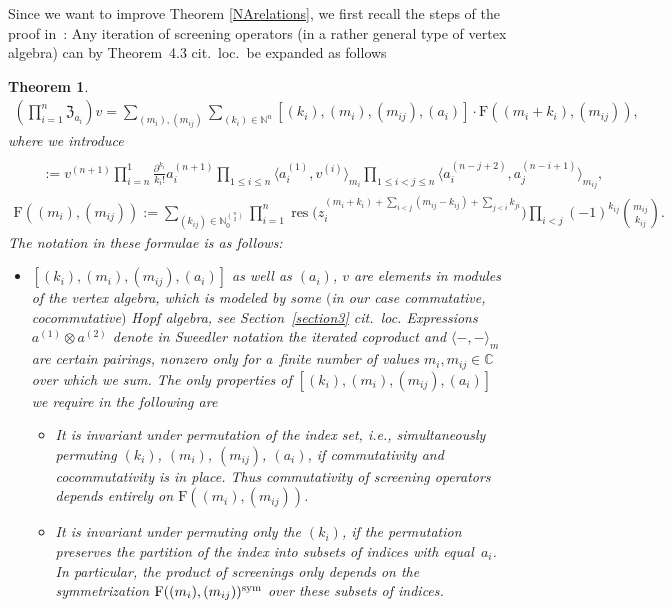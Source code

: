 \documentclass[pdftex]{sigma}%
\numberwithin{equation}{section}
\newtheorem{teo}{Theorem}[section]
\newcommand{\N}{\mathbb{N}}
\newcommand{\C}{\mathbb{C}}
\newcommand{\zem}{\mathfrak{Z}}
\newcommand{\Fp}{\mathrm{F}}
\begin{document}
Since we want to improve Theorem \ref{NArelations}, we first recall the steps of the proof in~\cite{Len17}: Any iteration of screening operators (in a rather general type of vertex algebra) can by Theorem~4.3 cit.~loc.~be expanded as follows
\begin{teo}\label{associativity}
\begin{gather*}
\left(\prod_{i=1}^n \zem_{a_i}\right)  v
=\sum_{(m_i),(m_{ij})} \sum_{(k_i)\in \N^n} [(k_i),(m_i),(m_{ij}),(a_i)]\cdot \Fp((m_i+k_i),(m_{ij})),
\end{gather*}
where we introduce
\begin{gather*}
[(k_i),(m_i),(m_{ij}),(a_i)]\\
\qquad{} :=v^{(n+1)}\prod_{i=n}^1 \frac{\partial^{k_i}}{k_i!}a_i^{(n+1)}
  \prod_{1\leq i \leq n}\big\langle a_i^{(1)},v^{(i)}\big\rangle_{m_i}
\prod_{1\leq i<j \leq n} \big\langle a_i^{(n-j+2)},a_j^{(n-i+1)}\big\rangle_{m_{ij}},\\
\Fp((m_i),(m_{ij}))
:=\sum_{(k_{ij})\in \N_0^{n\choose 2}}\prod_{i=1}^n \operatorname{res}\big(z_i^{(m_i+k_i)+\sum_{i<j}(m_{ij}-k_{ij})+\sum_{j<i}k_{ji}}\big)\prod_{i<j} (- 1)^{k_{ij}}{m_{ij} \choose k_{ij}}.
\end{gather*}
The notation in these formulae is as follows:
\begin{itemize}\itemsep=0pt
	\item $[(k_i),(m_i),(m_{ij}),(a_i)]$ as well as $(a_i)$, $v$ are elements in modules of the vertex algebra, which is modeled by some $($in our case commutative, cocommutative$)$ Hopf algebra, see Section~\ref{section3} cit.~loc. Expressions $a^{(1)}\otimes a^{(2)}$ denote in Sweedler notation the iterated coproduct and $\langle-,-\rangle_m$ are certain pairings, nonzero only for a~finite number of values $m_i,m_{ij}\in \C$ over which we sum. The only properties of $[(k_i),(m_i),(m_{ij}),(a_i)]$ we require in the following are
	\begin{itemize}\itemsep=0pt
		\item It is invariant under permutation of the index set, i.e., simultaneously permuting $(k_i)$, $(m_i)$, $(m_{ij})$, $(a_i)$, if commutativity and cocommutativity is in place. Thus commutativity of screening operators depends entirely on $\Fp((m_i),(m_{ij}))$.
		\item It is invariant under permuting only the $(k_i)$, if the permutation preserves the partition of the index into subsets of indices with equal~$a_i$. In particular, the product of screenings only depends on the symmetrization $\Fp((m_i),(m_{ij}))^{{\rm sym}}$ over these subsets of indices.

\end{itemize}
\end{itemize}
\end{teo}
\end{document}
